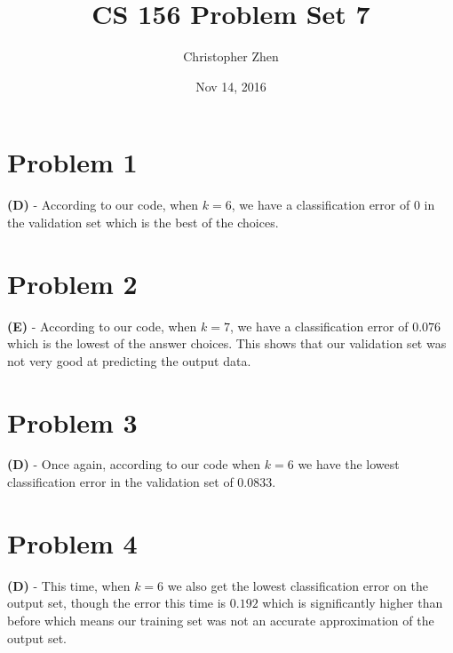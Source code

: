 \documentclass[10pt,letter]{article}
\begin{document}


\title{CS 156 Problem Set 7}

\author{Christopher Zhen}

\date{Nov 14, 2016}
 
\maketitle 
	
\section*{Problem 1}

\textbf{(D)} - According to our code, when $k = 6$, we have a classification error of 0 in the validation set which is the best of the choices.

\section*{Problem 2}

\textbf{(E)} - According to our code, when $k = 7$, we have a classification error of $0.076$ which is the lowest of the answer choices. This shows that our validation set was not very good at predicting the output data.


\section*{Problem 3} 

\textbf{(D)} - Once again, according to our code when $k = 6$ we have the lowest classification error in the validation set of $0.0833$.

\section*{Problem 4}

\textbf{(D)} - This time, when $k = 6$ we also get the lowest classification error on the output set, though the error this time is $0.192$ which is significantly higher than before which means our training set was not an accurate approximation of the output set.
\end{document}
